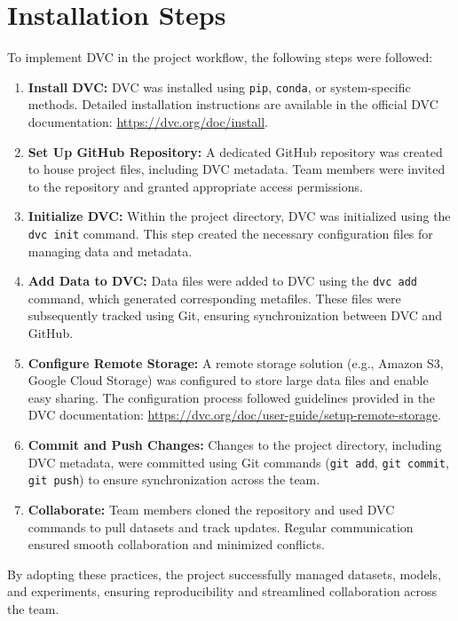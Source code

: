 \section{Installation Steps}

To implement DVC in the project workflow, the following steps were followed:

\begin{enumerate}
	\item \textbf{Install DVC:} DVC was installed using \texttt{pip}, \texttt{conda}, or system-specific methods. Detailed installation instructions are available in the official DVC documentation: \url{https://dvc.org/doc/install}.
	
	\item \textbf{Set Up GitHub Repository:} A dedicated GitHub repository was created to house project files, including DVC metadata. Team members were invited to the repository and granted appropriate access permissions.
	
	\item \textbf{Initialize DVC:} Within the project directory, DVC was initialized using the \texttt{dvc init} command. This step created the necessary configuration files for managing data and metadata.
	
	\item \textbf{Add Data to DVC:} Data files were added to DVC using the \texttt{dvc add} command, which generated corresponding metafiles. These files were subsequently tracked using Git, ensuring synchronization between DVC and GitHub.
	
	\item \textbf{Configure Remote Storage:} A remote storage solution (e.g., Amazon S3, Google Cloud Storage) was configured to store large data files and enable easy sharing. The configuration process followed guidelines provided in the DVC documentation: \url{https://dvc.org/doc/user-guide/setup-remote-storage}.
	
	\item \textbf{Commit and Push Changes:} Changes to the project directory, including DVC metadata, were committed using Git commands (\texttt{git add}, \texttt{git commit}, \texttt{git push}) to ensure synchronization across the team.
	
	\item \textbf{Collaborate:} Team members cloned the repository and used DVC commands to pull datasets and track updates. Regular communication ensured smooth collaboration and minimized conflicts.
\end{enumerate}

By adopting these practices, the project successfully managed datasets, models, and experiments, ensuring reproducibility and streamlined collaboration across the team.
